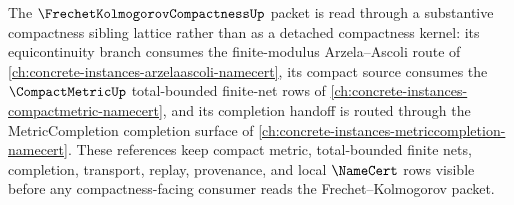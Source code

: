 The $\FrechetKolmogorovCompactnessUp$ packet is read through a substantive compactness sibling lattice rather than as a detached compactness kernel: its equicontinuity branch consumes the finite-modulus Arzela--Ascoli route of \autoref{ch:concrete-instances-arzelaascoli-namecert}, its compact source consumes the $\CompactMetricUp$ total-bounded finite-net rows of \autoref{ch:concrete-instances-compactmetric-namecert}, and its completion handoff is routed through the MetricCompletion completion surface of \autoref{ch:concrete-instances-metriccompletion-namecert}. These references keep compact metric, total-bounded finite nets, completion, transport, replay, provenance, and local $\NameCert$ rows visible before any compactness-facing consumer reads the Frechet--Kolmogorov packet.
